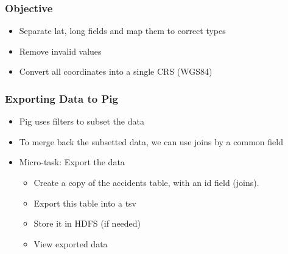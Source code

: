 \documentclass[hyperref={pdfpagelabels=true}]{beamer}
\begin{document}
\begin{frame}
\frametitle{Objective}
\begin{itemize}
  \item<1->Separate lat, long fields and map them to correct types
  \item<1->Remove invalid values  
  \item<1->Convert all coordinates into a single CRS (WGS84)
\end{itemize}
\end{frame}

\begin{frame}
\frametitle{Exporting Data to Pig}
\begin{itemize}
  \item<1->Pig uses filters to subset the data
  \item<1->To merge back the subsetted data, we can use joins by a common field  
  \item<1->Micro-task: Export the data
  \begin{itemize}
    \item<2->Create a copy of the accidents table, with an id field (joins).
    \item<3->Export this table into a tsv
    \item<4->Store it in HDFS (if needed)
    \item<4->View exported data    
  \end{itemize}
\end{itemize}
\end{frame}
\end{document}
